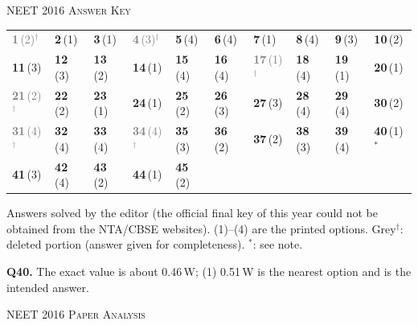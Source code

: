 \par{}\vspace{14pt}
\begin{center}{}\par
{\large\color{navy}\scshape NEET 2016 \textperiodcentered{} Answer Key}\end{center}
{\small\setlength{\tabcolsep}{1pt}\renewcommand{\arraystretch}{1.5}
\begin{tabularx}{\linewidth}{@{}*{10}{>{\centering\arraybackslash}X}@{}}\toprule
\textcolor{gray}{\textbf{1}\,(2)$^{\dagger}$} & \textbf{2}\,(1) & \textbf{3}\,(1) & \textcolor{gray}{\textbf{4}\,(3)$^{\dagger}$} & \textbf{5}\,(4) & \textbf{6}\,(4) & \textbf{7}\,(1) & \textbf{8}\,(4) & \textbf{9}\,(3) & \textbf{10}\,(2)\\
\textbf{11}\,(3) & \textbf{12}\,(3) & \textbf{13}\,(2) & \textbf{14}\,(1) & \textbf{15}\,(4) & \textbf{16}\,(4) & \textcolor{gray}{\textbf{17}\,(1)$^{\dagger}$} & \textbf{18}\,(4) & \textbf{19}\,(1) & \textbf{20}\,(1)\\
\textcolor{gray}{\textbf{21}\,(2)$^{\dagger}$} & \textbf{22}\,(2) & \textbf{23}\,(1) & \textbf{24}\,(1) & \textbf{25}\,(2) & \textbf{26}\,(3) & \textbf{27}\,(3) & \textbf{28}\,(4) & \textbf{29}\,(4) & \textbf{30}\,(2)\\
\textcolor{gray}{\textbf{31}\,(4)$^{\dagger}$} & \textbf{32}\,(4) & \textbf{33}\,(4) & \textcolor{gray}{\textbf{34}\,(4)$^{\dagger}$} & \textbf{35}\,(3) & \textbf{36}\,(2) & \textbf{37}\,(2) & \textbf{38}\,(3) & \textbf{39}\,(4) & \textbf{40}\,(1)$^{*}$\\
\textbf{41}\,(3) & \textbf{42}\,(4) & \textbf{43}\,(2) & \textbf{44}\,(1) & \textbf{45}\,(2) &  &  &  &  & \\\bottomrule\end{tabularx}}\par\smallskip
{\footnotesize Answers solved by the editor (the official final key of this year could not be obtained from the NTA/CBSE websites). (1)--(4) are the printed options. {\color{gray}Grey$^{\dagger}$}: deleted portion (answer given for completeness). $^{*}$: see note.\par
\par\smallskip\textbf{Q40.} The exact value is about 0.46\,W; (1) 0.51\,W is the nearest option and is the intended answer.
}\par
\clearpage
\begin{center}{}\par
{\fontsize{20}{24}\selectfont\color{navy}\scshape NEET 2016 \textperiodcentered{} Paper Analysis}\par
{\color{gilt}}\end{center}
